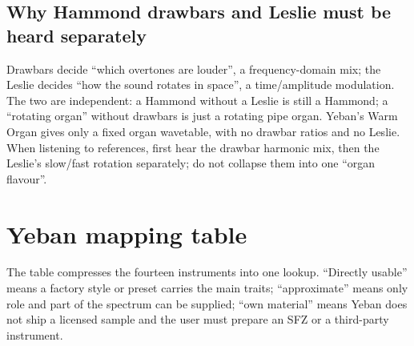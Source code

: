 \subsection{Why Hammond drawbars and Leslie must be heard separately}
\label{sec:iconic-why-hammond}

Drawbars decide ``which overtones are louder'', a frequency-domain mix;
the Leslie decides ``how the sound rotates in space'', a time/amplitude
modulation. The two are independent: a Hammond without a Leslie is still a
Hammond; a ``rotating organ'' without drawbars is just a rotating pipe organ.
Yeban's Warm Organ gives only a fixed organ wavetable, with no drawbar ratios
and no Leslie. When listening to references, first hear the drawbar harmonic
mix, then the Leslie's slow/fast rotation separately; do not collapse them
into one ``organ flavour''.

\section{Yeban mapping table}
\label{sec:iconic-yeban-map}

The table compresses the fourteen instruments into one lookup. ``Directly
usable'' means a factory style or preset carries the main traits;
``approximate'' means only role and part of the spectrum can be supplied;
``own material'' means Yeban does not ship a licensed sample and the user
must prepare an SFZ or a third-party instrument.

